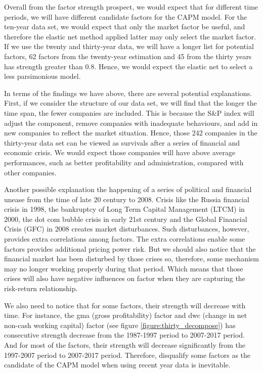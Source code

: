 Overall from the factor strength prospect, we would expect that for different time periods, we will have different candidate factors for the CAPM model.
For the ten-year data set, we would expect that only the market factor be useful, and therefore the elastic net method applied latter may only select the market factor.
If we use the twenty and thirty-year data, we will have a longer list for potential factors, 62 factors from the twenty-year estimation and 45 from the thirty years has strength greater than 0.8.
Hence, we would expect the elastic net to select a less parsimonious model. 

In terms of the findings we have above, there are several potential explanations.
First, if we consider the structure of our data set, we will find that the longer the time span, the fewer companies are included.
This is because the S\&P index will adjust the component, remove companies with inadequate behaviours, and add in new companies to reflect the market situation.
Hence, those 242 companies in the thirty-year data set can be viewed as survivals after a series of financial and economic crisis.
We would expect those companies will have above average performances, such as better profitability and administration, compared with other companies. 


Another possible explanation the happening of a series of political and financial unease from the time of late 20 century to 2008.
Crisis like the Russia financial crisis in 1998, the bankruptcy of Long Term Capital Management (LTCM) in 2000, the dot com bubble crisis in early 21st century and the Global Financial Crisis (GFC) in 2008 creates market disturbances.
Such disturbances, however, provides extra correlations among factors.
The extra correlations enable some factors provides additional pricing power risk.
But we should also notice that the financial market has been disturbed by those crises so, therefore, some mechanism may no longer working properly during that period.
Which means that those crises will also have negative influences on factor when they are capturing the risk-return relationship.

We also need to notice that for some factors, their strength will decrease with time.
For instance, the gma (gross profitability) factor and dwc (change in net non-cash working capital) factor (see figure \ref{figure:thirty_decompose}) has consecutive strength decrease from the 1987-1997 period to 2007-2017 period.
And for most of the factors, their strength will decrease significantly from the 1997-2007 period to 2007-2017 period.
Therefore, disqualify some factors as the candidate of the CAPM model when using recent year data is inevitable.
